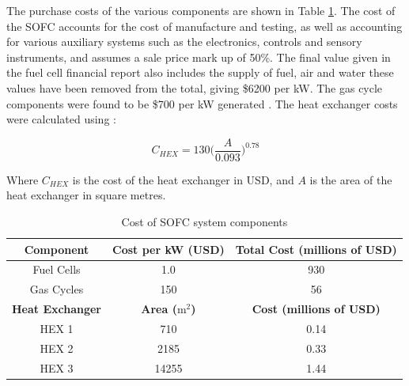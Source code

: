 \documentclass{article}
\begin{document}
The purchase costs of the various components are shown in Table \ref{LMtable:SOFCcyclecosts}. The cost of the SOFC accounts for the cost of manufacture and testing, as well as accounting for various auxiliary systems such as the electronics, controls and sensory instruments, and assumes a sale price mark up of 50\%. The final value given in the fuel cell financial report \cite{LM21} also includes the supply of fuel, air and water \text{-} these values have been removed from the total, giving \$6200 per kW. The gas cycle components were found to be \$700 per kW generated \cite{LM22}. The heat exchanger costs were calculated using \cite{LM23}:

\begin{equation}
C_{HEX}=130\Big ( \frac{A}{0.093}\Big )	^{0.78} 					
\end{equation}

Where $C_{HEX}$ is the cost of the heat exchanger in USD, and $A$ is the area of the heat exchanger in square metres.


\begin{table}[h!]
\centering
\caption{Cost of SOFC system components}
\label{LMtable:SOFCcyclecosts}
\begin{tabular}{|c|c|c|}
\hline
\textbf{Component}      & \textbf{Cost per kW (USD)} & \textbf{Total Cost (millions of USD)} \\ \hline
Fuel Cells              & 1.0                        & 930                                   \\ \hline
Gas Cycles              & 150                        & 56                                    \\ \hline
\textbf{Heat Exchanger} & \textbf{Area ($\text{m}^{2}$)}         & \textbf{Cost (millions of USD)}       \\ \hline
HEX 1                   & 710                        & 0.14                                  \\ \hline
HEX 2                   & 2185                       & 0.33                                  \\ \hline
HEX 3                   & 14255                      & 1.44                                  \\ \hline
\end{tabular}
\end{table}

\end{document}
